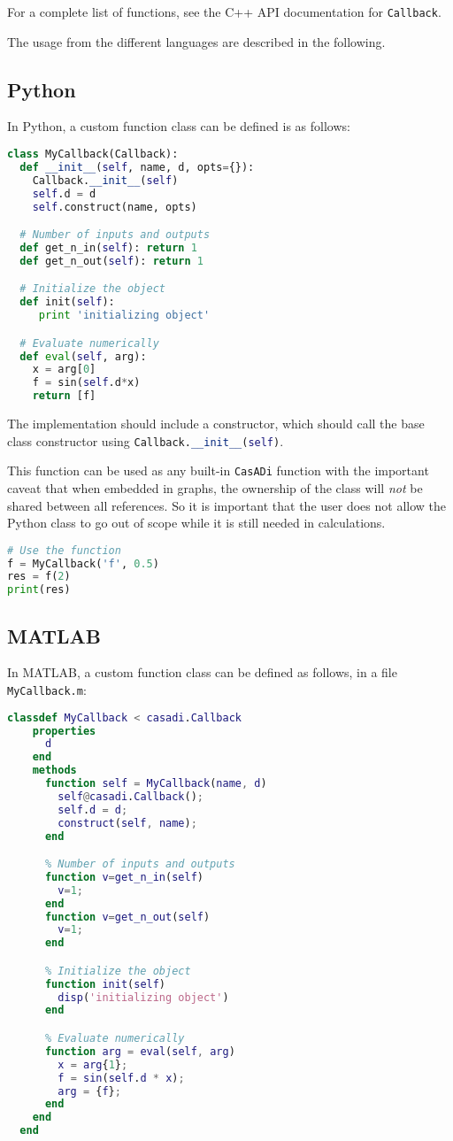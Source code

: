 \documentclass[a4paper,12pt]{book}
\newcommand{\CasADi}{\texttt{CasADi}\xspace}
\begin{document}
For a complete list of functions, see the C++ API documentation for
\texttt{Callback}.

The usage from the different languages are described in the following.

\subsection*{Python}
In Python, a custom function class can be defined is as follows:
\begin{lstlisting}[language=Python]
class MyCallback(Callback):
  def __init__(self, name, d, opts={}):
    Callback.__init__(self)
    self.d = d
    self.construct(name, opts)

  # Number of inputs and outputs
  def get_n_in(self): return 1
  def get_n_out(self): return 1

  # Initialize the object
  def init(self):
     print 'initializing object'

  # Evaluate numerically
  def eval(self, arg):
    x = arg[0]
    f = sin(self.d*x)
    return [f]
\end{lstlisting}

The implementation should include a constructor, which should call the
base class constructor using
\lstinline[language=Python]{Callback.__init__(self)}.

This function can be used as any built-in \CasADi function with the important
caveat that when embedded in graphs, the ownership of the class will \emph{not}
be shared between all references. So it is important that the user does not
allow the Python class to go out of scope while it is still needed in
calculations.

\begin{lstlisting}[language=Python]
# Use the function
f = MyCallback('f', 0.5)
res = f(2)
print(res)
\end{lstlisting}

\subsection*{MATLAB}
In MATLAB, a custom function class can be defined as follows, in a file
\verb|MyCallback.m|:

\begin{lstlisting}[language=Matlab]
  classdef MyCallback < casadi.Callback
    properties
      d
    end
    methods
      function self = MyCallback(name, d)
        self@casadi.Callback();
        self.d = d;
        construct(self, name);
      end

      % Number of inputs and outputs
      function v=get_n_in(self)
        v=1;
      end
      function v=get_n_out(self)
        v=1;
      end

      % Initialize the object
      function init(self)
        disp('initializing object')
      end

      % Evaluate numerically
      function arg = eval(self, arg)
        x = arg{1};
        f = sin(self.d * x);
        arg = {f};
      end
    end
  end
\end{lstlisting}
\end{document}
